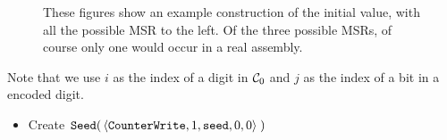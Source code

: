\begin{figure}[H]
    \caption{\label{fig:initial_value_assemblies} These figures show an example construction of the initial value,
    with all the possible MSR to the left. Of the three possible MSRs, of course only one would occur in a real assembly.}
\end{figure}

Note that we use $i$ as the index of a digit in $\mathcal{C}_0$ and $j$ as the index of a bit
in a encoded digit.

\begin{itemize}
    \item Create
    $\begin{aligned}[t]
        {\tt Seed}(&\left\langle {\tt CounterWrite}, 1, {\tt seed}, 0, 0 \right\rangle \; )
    \end{aligned}$
\end{itemize}



